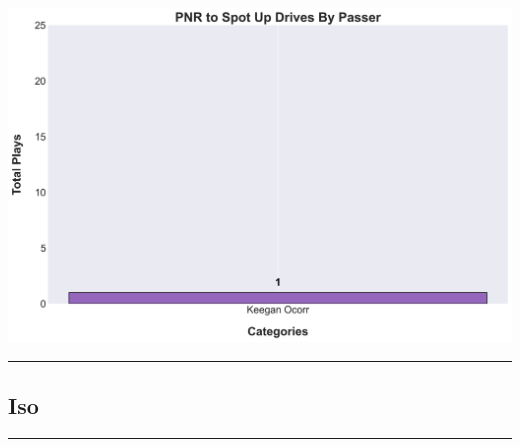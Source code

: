 \documentclass[a4paper,12pt]{article}
\begin{document}
\begin{table}[H]
{\begin{minipage}[t]{0.6\textwidth}
{\begin{tabular}
            \bottomrule
        \end{tabular}
        } %
    \end{minipage}
    } %
    \hfill %
    \begin{minipage}[c]{0.35\textwidth} %
        \flushright
        \includegraphics[width=\textwidth, height=.14\textheight]{images/SpotUp_PnrDrivesPlayer_Freq.png} %
    \end{minipage}
\end{table}

\vspace{-1em} %
\hrule height 1pt width 1\textwidth %
\vspace{1em} %





\subsection{Iso}

\vspace{1em} %
\hrule height 1pt width 1\textwidth %
\vspace{1em} %
\end{document}
